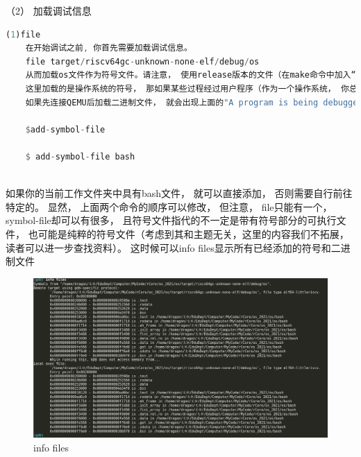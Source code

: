 （2） 加载调试信息

\begin{lstlisting}[language={Rust}, label={code:forktest},
	caption={forktest.rs}]
	(1)file
	在开始调试之前, 你首先需要加载调试信息。
	file target/riscv64gc-unknown-none-elf/debug/os
	从而加载os文件作为符号文件。请注意， 使用release版本的文件（在make命令中加入“MODE=release”得到）往往不带有任何的调试信息， 不适合用于debug， 但也不尽然： 你可以对着汇编语言调试。 当然， 就算使用了带有符号文件的版本，这种体验你总会遇到的， 因为操作系统总是要涉及某些底层。
	这里加载的是操作系统的符号， 那如果某些过程经过用户程序（作为一个操作系统， 你总会遇到这种问题）， 如何添加用户程序的代码？这就要用到一下一个命令了。
	如果先连接QEMU后加载二进制文件， 就会出现上面的"A program is being debugged already."提示，当然这并不影响使用。
	
	$add-symbol-file
	
	$ add-symbol-file bash
	
\end{lstlisting}

如果你的当前工作文件夹中具有bash文件， 就可以直接添加， 否则需要自行前往特定的。 显然， 上面两个命令的顺序可以修改， 但注意， file只能有一个， symbol-file却可以有很多， 且符号文件指代的不一定是带有符号部分的可执行文件， 也可能是纯粹的符号文件（考虑到其和主题无关，这里的内容我们不拓展，读者可以进一步查找资料）。 这时候可以info files显示所有已经添加的符号和二进制文件

\begin{figure}[htb]
\centering
\includegraphics[width=\textwidth]{figures/02-02-info files.png}
\caption{
	info files
}
\label{fig:info files}
\end{figure}

